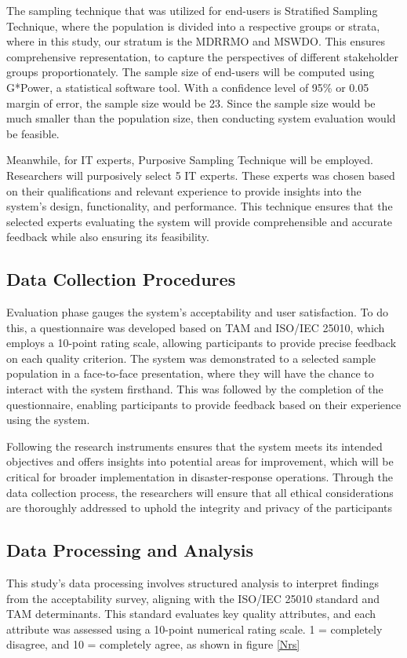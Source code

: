 	The sampling technique that was utilized for end-users is Stratified Sampling Technique, where the population is divided into a respective groups or strata, where in this study, our stratum is the MDRRMO and MSWDO. This ensures comprehensive representation, to capture the perspectives of different stakeholder groups proportionately. The sample size of end-users will be computed using G*Power, a statistical software tool. With a confidence level of 95\% or 0.05 margin of error, the sample size would be 23. Since the sample size would be much smaller than the population size, then conducting system evaluation would be feasible.
	
	Meanwhile, for IT experts, Purposive Sampling Technique will be employed. Researchers will purposively select 5 IT experts. These experts was chosen based on their qualifications and relevant experience to provide insights into the system's design, functionality, and performance. This technique ensures that the selected experts evaluating the system will provide comprehensible and accurate feedback while also ensuring its feasibility.
	
\subsection{Data Collection Procedures}
	Evaluation phase gauges the system’s acceptability and user satisfaction. To do this, a questionnaire was developed based on TAM and ISO/IEC 25010, which employs a 10-point rating scale, allowing participants to provide precise feedback on each quality criterion. The system was demonstrated to a selected sample population in a face-to-face presentation, where they will have the chance to interact with the system firsthand. This was followed by the completion of the questionnaire, enabling participants to provide feedback based on their experience using the system.
	
	Following the research instruments ensures that the system meets its intended objectives and offers insights into potential areas for improvement, which will be critical for broader implementation in disaster-response operations. Through the data collection process, the researchers will ensure that all ethical considerations are thoroughly addressed to uphold the integrity and privacy of the participants

\subsection{Data Processing and Analysis}
	This study's data processing involves structured analysis to interpret findings from the acceptability survey, aligning with the ISO/IEC 25010 standard and TAM determinants. This standard evaluates key quality attributes, and each attribute was assessed using a 10-point numerical rating scale. 1 = completely disagree, and 10 = completely agree, as shown in figure \ref{Nrs}
	
